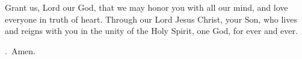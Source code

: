\lettrine[lines=3]{G}{}rant us, Lord our God,
that we may honor you with all our mind,
and love everyone in truth of heart.
Through our Lord Jesus Christ, your Son,
who lives and reigns with you in the unity of the Holy Spirit,
one God, for ever and ever. \par \Rbar.~Amen.
